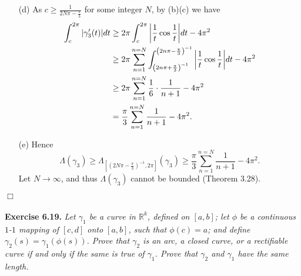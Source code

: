 \documentclass{article}
\begin{document}
\begin{enumerate}
\begin{enumerate}
    \item[(d)]
    As $c \geq \frac{1}{2N\pi - \frac{\pi}{3}}$ for some integer $N$,
    by (b)(c) we have
    \begin{align*}
      \int_{c}^{2\pi} |\gamma_3'(t)| dt
      &\geq
      2\pi \int_{c}^{2\pi} \abs{\frac{1}{t}\cos\frac{1}{t}} dt - 4\pi^2 \\
      &\geq
      2\pi \sum_{n=1}^{n=N}
        \int_{\left(2n\pi + \frac{\pi}{3}\right)^{-1}}^{\left(2n\pi - \frac{\pi}{3}\right)^{-1}}
          \abs{\frac{1}{t}\cos\frac{1}{t}} dt - 4\pi^2 \\
      &\geq
      2\pi \sum_{n=1}^{n=N}
        \frac{1}{6} \cdot \frac{1}{n+1} - 4\pi^2 \\
      &=
      \frac{\pi}{3} \sum_{n=1}^{n=N} \frac{1}{n+1} - 4\pi^2.
    \end{align*}

    \item[(e)]
    Hence
    \[
      \Lambda(\gamma_3)
      \geq
      \Lambda_{\left[\left(2N\pi - \frac{\pi}{3}\right)^{-1},2\pi\right]}(\gamma_3)
      \geq
      \frac{\pi}{3} \sum_{n=1}^{n=N} \frac{1}{n+1} - 4\pi^2.
    \]
    Let $N \to \infty$, and thus $\Lambda(\gamma_3)$ cannot be bounded (Theorem 3.28).
  \end{enumerate}
\end{enumerate}
$\Box$ \\\\






\textbf{Exercise 6.19.}
\emph{Let $\gamma_1$ be a curve in $\mathbb{R}^k$, defined on $[a,b]$;
let $\phi$ be a continuous $1$-$1$ mapping of $[c,d]$ onto $[a,b]$, such that
$\phi(c) = a$; and define $\gamma_2(s) = \gamma_1(\phi(s))$.
Prove that $\gamma_2$ is an arc, a closed curve, or a rectifiable curve
if and only if the same is true of $\gamma_1$.
Prove that $\gamma_2$ and $\gamma_1$ have the same length.} \\
\end{document}
